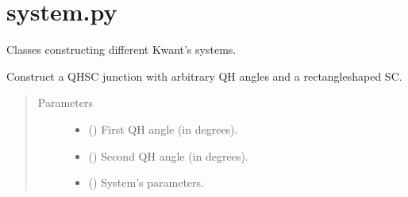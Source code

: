 \documentclass[letterpaper,10pt,english]{sphinxmanual}
\begin{document}
\section{system.py}
\label{\detokenize{modules:module-modules.system}}\label{\detokenize{modules:system-py}}
\sphinxAtStartPar
Classes constructing different Kwant’s systems.

\begin{fulllineitems}
\label{\detokenize{modules:modules.system.Device}}
\pysigstartsignatures
{}
\pysigstopsignatures
\sphinxAtStartPar
Construct a QH\sphinxhyphen{}SC junction with arbitrary QH angles 
and a rectangle\sphinxhyphen{}shaped SC.
\begin{quote}\begin{description}
\item[{Parameters}] \leavevmode\begin{itemize}
\item {} 
\sphinxAtStartPar
{} () \textendash{} First QH angle (in degrees).

\item {} 
\sphinxAtStartPar
{} () \textendash{} Second QH angle (in degrees).

\item {} 
\sphinxAtStartPar
{} () \textendash{} System’s parameters.

\end{itemize}

\end{description}\end{quote}


\end{fulllineitems}
\end{document}

